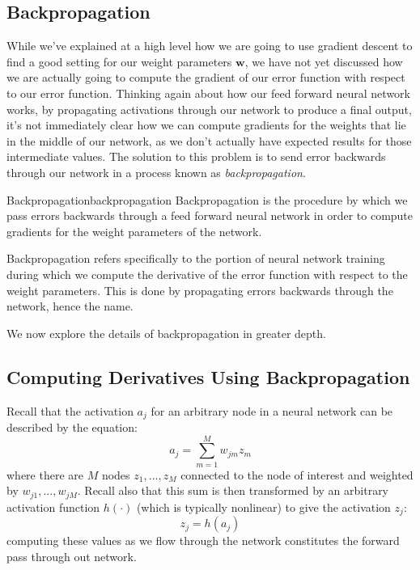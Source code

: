 \subsection{Backpropagation}
While we've explained at a high level how we are going to use gradient descent to find a good setting for our weight parameters $\textbf{w}$, we have not yet discussed how we are actually going to compute the gradient of our error function with respect to our error function. Thinking again about how our feed forward neural network works, by propagating activations through our network to produce a final output, it's not immediately clear how we can compute gradients for the weights that lie in the middle of our network, as we don't actually have expected results for those intermediate values. The solution to this problem is to send error backwards through our network in a process known as \textit{backpropagation}.

\begin{definition}{Backpropagation}{backpropagation}
Backpropagation is the procedure by which we pass errors backwards through a feed forward neural network in order to compute gradients for the weight parameters of the network.
\end{definition}

Backpropagation refers specifically to the portion of neural network training during which we compute the derivative of the error function with respect to the weight parameters. This is done by propagating errors backwards through the network, hence the name.


We now explore the details of backpropagation in greater depth.

\subsection{Computing Derivatives Using Backpropagation}
Recall that the activation $a_{j}$ for an arbitrary node in a neural network can be described by the equation:
\begin{equation} \label{activations-reminder}
	a_{j} = \sum_{m=1}^{M} w_{jm} z_{m}
\end{equation}
where there are $M$ nodes $z_{1}, ..., z_{M}$ connected to the node of interest and weighted by $w_{j1}, ..., w_{jM}$. Recall also that this sum is then transformed by an arbitrary activation function $h(\cdot)$ (which is typically nonlinear) to give the activation $z_{j}$:
\begin{equation} \label{transformed-activations-reminder}
	z_{j} = h(a_{j})
\end{equation}
computing these values as we flow through the network constitutes the forward pass through out network.

